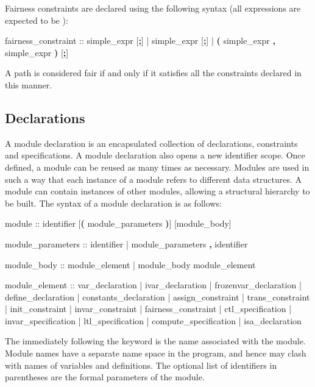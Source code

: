 Fairness constraints are declared using the following syntax (all
expressions are expected to be \Boolean):
%
\begin{Grammar}
fairness_constraint ::
        simple_expr [\textbf{;}]
     |  simple_expr [\textbf{;}]
     |  \textbf{(} simple_expr \textbf{,} simple_expr \textbf{)} [\textbf{;}]
\end{Grammar}
%
A path is considered fair if and only if it satisfies all the
constraints declared in this manner.


\subsection { Declarations}
\label{MODULE Declarations}
%
A module declaration is an encapsulated collection of declarations,
constraints and specifications.
%
A module declaration also opens a new
identifier scope.
%
Once defined, a module can be reused as many times as
necessary.
%
Modules are used in such a way that each instance of a module refers to
different data structures.
%
A module can contain instances of other modules, allowing a structural
hierarchy to be built.
%
The syntax of a module declaration is as follows:
%
\begin{Grammar}
module ::  identifier [\textbf{(} module_parameters \textbf{)}] [module_body]

module_parameters ::
          identifier
        | module_parameters \textbf{,} identifier

module_body ::
          module_element
        | module_body module_element

module_element ::
          var_declaration
        | ivar_declaration
        | frozenvar_declaration
        | define_declaration
        | constants_declaration
        | assign_constraint
        | trans_constraint
        | init_constraint
        | invar_constraint
        | fairness_constraint
        | ctl_specification
        | invar_specification
        | ltl_specification
        | compute_specification
        | isa_declaration
\end{Grammar}
%
The  immediately following the keyword
 is the name associated with the module.
%
Module names have a separate name space in the program, and hence may
clash with names of variables and definitions.
%
The optional list of identifiers in parentheses are the formal
parameters of the module.

